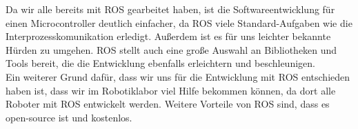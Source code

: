 \begin{flushleft}
    Da wir alle bereits mit ROS gearbeitet haben, ist die Softwareentwicklung für einen Microcontroller deutlich einfacher, da ROS viele Standard-Aufgaben wie die Interprozesskomunikation erledigt. Außerdem ist es für uns leichter bekannte Hürden zu umgehen.
    ROS stellt auch eine große Auswahl an Bibliotheken und Tools bereit, die die Entwicklung ebenfalls erleichtern und beschleunigen.\\
    
    Ein weiterer Grund dafür, dass wir uns für die Entwicklung mit ROS entschieden haben ist, dass wir im Robotiklabor viel Hilfe bekommen können, da dort alle Roboter mit ROS entwickelt werden.
    Weitere Vorteile von ROS sind, dass es open-source ist und kostenlos. \cite{ros}

    
\end{flushleft}